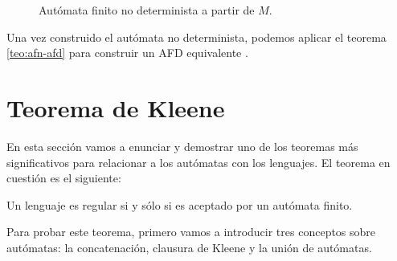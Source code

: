\begin{figure}[h!]
    \centering
    \caption{Autómata finito no determinista a partir de $M$.}\label{fig:adn-adnl}
\end{figure}

\vspace{10pt}
Una vez construido el autómata no determinista, podemos aplicar el teorema \ref{teo:afn-afd} para construir un AFD
equivalente \cite{chakraborty_2003}.

\section{Teorema de Kleene}

En esta sección vamos a enunciar y demostrar uno de los teoremas más significativos para relacionar a los autómatas con
los lenguajes. El teorema en cuestión es el siguiente:

\begin{teorema}[Kleene]\label{teo:kleene}Un lenguaje es regular si y sólo si es aceptado por un autómata finito.
\end{teorema}

Para probar este teorema, primero vamos a introducir tres conceptos sobre autómatas: la concatenación, clausura de
Kleene y la unión de autómatas.

